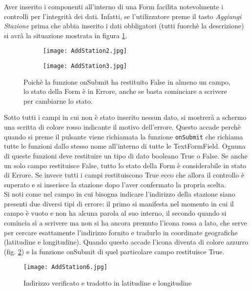 Aver
inserito i componenti all'interno di una Form facilita notevolmente i controlli
per l'integrità dei dati. Infatti, se l'utilizzatore preme il tasto
\textit{Aggiungi Stazione} prima che abbia inserito i dati obbligatori (tutti
fuorchè la descrizione) si avrà la situazione mostrata in figura \ref{addStation2}.
\begin{figure}[!h]
    \centering
    \begin{subfigure}{0.36\linewidth}
        \texttt{[image: AddStation2.jpg]}
    \end{subfigure}
    \begin{subfigure}{0.36\linewidth}
        \texttt{[image: AddStation3.jpg]}
    \end{subfigure}
    \caption{Poichè la funzione onSubmit ha restituito False in almeno un campo,
    lo stato della Form è in Errore, anche se basta cominciare a scrivere
    per cambiarne lo stato.}
    \label{addStation2}
\end{figure}
Sotto tutti i campi in cui non è stato inserito nessun dato, si mostrerà a
schermo una scritta di colore rosso indicante il motivo dell'errore. Questo
accade perchè quando si preme il pulsante viene richiamata la funzione
\texttt{onSubmit} che richiama tutte le funzioni dallo stesso nome all'interno
di tutte le TextFormField. Ognuna di queste funzioni deve restituire un tipo di
dato booleano
True o False. Se anche un solo campo restituisce False, tutto lo stato della
Form è considerabile in stato di Errore. Se invece tutti i campi restituiscono
True ecco che allora il controllo è superato e si inserisce la stazione dopo
l'aver confermato la propria scelta. \\
Si  noti come nel campo in cui bisogna indicare l'indirizzo della stazione siano
presenti due diversi tipi di errore: il primo si manifesta nel momento in cui il
campo è vuoto e non ha alcuna parola al suo interno, il secondo quando si
comincia sì a scrivere ma non si ha ancora premuto l'icona rossa a lato, che
serve per cercare esattamente l'indirizzo fornito e tradurlo in coordinate
geografiche (latitudine e longitudine). Quando questo accade l'icona diventa di
colore azzurro (fig. \ref{addStation6}) e la funzione onSubmit di quel particolare campo
restituisce True.
\begin{figure}[!h]
    \centering
    \texttt{[image: AddStation6.jpg]}
    \caption{Indirizzo verificato e tradotto in latitudine e longitudine}
    \label{addStation6}
\end{figure}  
